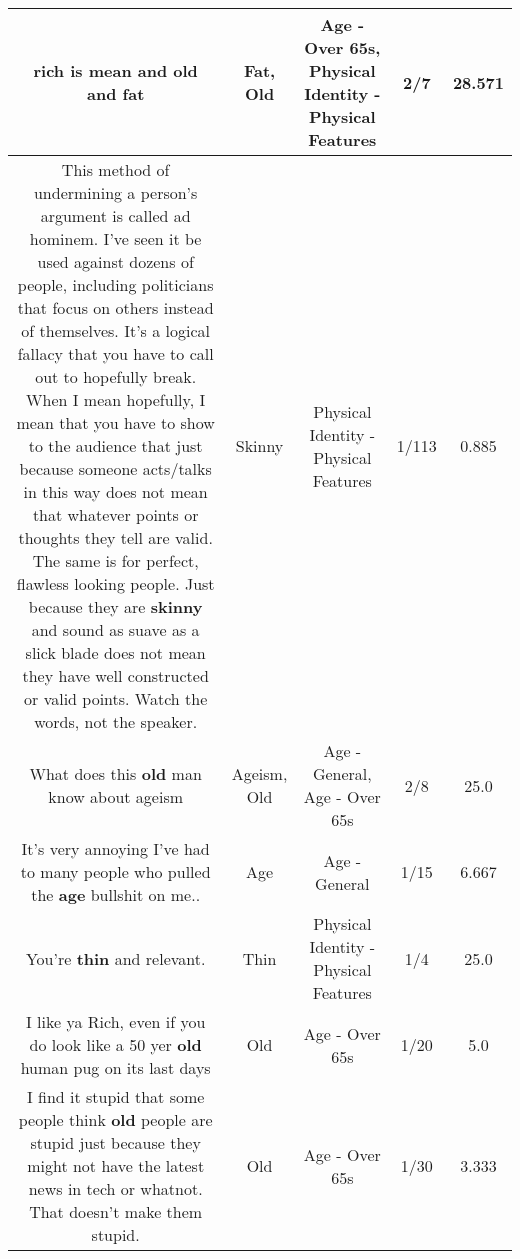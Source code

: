 \documentclass[11pt]{article}
\newlength\mylength
\begin{document}
\begin{center}
\begin{longtable}{|C{.65\mylength}|C{.30\mylength}|C{.12\mylength}|C{.12\mylength}|C{.12\mylength}|}
  \small rich is mean and \textbf{old} and fat\normalsize   & Fat, Old & Age - Over 65s, Physical Identity - Physical Features & 2/7 & 28.571 \\  \hline
  \small This method of undermining a person's argument is called ad hominem. I've seen it be used against dozens of people, including politicians that focus on others instead of themselves. It's a logical fallacy that you have to call out to hopefully break. When I mean hopefully, I mean that you have to show to the audience that just because someone acts/talks in this way does not mean that whatever points or thoughts they tell are valid. The same is for perfect, flawless looking people. Just because they are \textbf{skinny} and sound as suave as a slick blade does not mean they have well constructed or valid points. Watch the words, not the speaker.\normalsize   & Skinny & Physical Identity - Physical Features & 1/113 & 0.885 \\  \hline
  \small What does this \textbf{old} man know about ageism\normalsize   & Ageism, Old & Age - General, Age - Over 65s & 2/8 & 25.0 \\  \hline
  \small It's very annoying I've had to many people who pulled the \textbf{age} bullshit on me..\normalsize   & Age & Age - General & 1/15 & 6.667 \\  \hline
  \small You're \textbf{thin} and relevant.\normalsize   & Thin & Physical Identity - Physical Features & 1/4 & 25.0 \\  \hline
  \small I like ya Rich, even if you do look like a 50 yer \textbf{old} human pug on its last days\normalsize   & Old & Age - Over 65s & 1/20 & 5.0 \\  \hline
  \small I find it stupid that some people think \textbf{old} people are stupid just because they might not have the latest news in tech or whatnot. That doesn't make them stupid.\normalsize   & Old & Age - Over 65s & 1/30 & 3.333 \\  \hline

\end{longtable}
\end{center}
\end{document}
